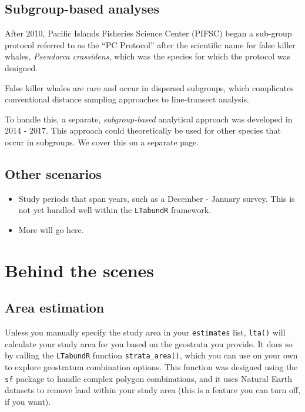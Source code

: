 \documentclass[
]{book}
\begin{document}
\hypertarget{subgroup-based-analyses}{%
\subsection*{Subgroup-based analyses}\label{subgroup-based-analyses}}

After 2010, Pacific Islands Fisheries Science Center (PIFSC) began a sub-group protocol referred to as the ``PC Protocol'' after the scientific name for false killer whales, \emph{Pseudorca crassidens}, which was the species for which the protocol was designed.

False killer whales are rare and occur in dispersed subgroups, which complicates conventional distance sampling approaches to line-transect analysis.

To handle this, a separate, \emph{subgroup-based} analytical approach was developed in 2014 - 2017. This approach could theoretically be used for other species that occur in subgroups. We cover this on a separate page.

\hypertarget{other-scenarios}{%
\subsection*{Other scenarios}\label{other-scenarios}}

\begin{itemize}
\item
  Study periods that span years, such as a December - January survey. This is not yet handled well within the \texttt{LTabundR} framework.
\item
  More will go here.
\end{itemize}

\hypertarget{behind-the-scenes-1}{%
\section*{Behind the scenes}\label{behind-the-scenes-1}}

\hypertarget{area-estimation}{%
\subsection*{Area estimation}\label{area-estimation}}

Unless you manually specify the study area in your \texttt{estimates} list, \texttt{lta()} will calculate your study area for you based on the geostrata you provide. It does so by calling the \texttt{LTabundR} function \texttt{strata\_area()}, which you can use on your own to explore geostratum combination options. This function was designed using the \texttt{sf} package to handle complex polygon combinations, and it uses Natural Earth datasets to remove land within your study area (this is a feature you can turn off, if you want).
\end{document}
